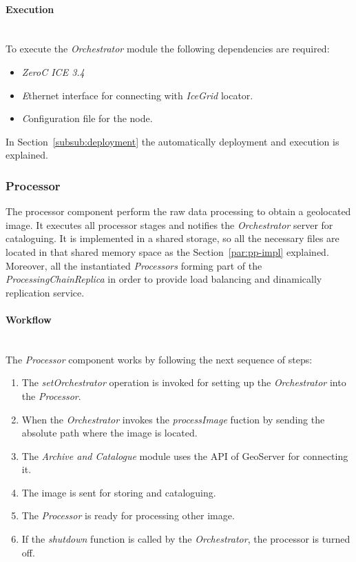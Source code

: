 \paragraph{Execution}~\\

To execute the \emph{Orchestrator} module the following dependencies
are required:
\begin{itemize}
\item \emph{ZeroC ICE 3.4}
\item \emph Ethernet interface for connecting with \emph{IceGrid} locator.
\item \emph Configuration file for the node.
\end{itemize}
 In Section~\ref{subsub:deployment} the
  automatically deployment and execution is explained. 

\subsubsection{Processor}

The processor component perform the raw data processing to obtain a
geolocated image. It executes all processor stages and notifies the
\emph{Orchestrator} server for cataloguing. It is implemented in a shared
storage, so all the necessary files are located in that shared memory space as
the Section~\ref{par:pp-impl} explained. Moreover, all the instantiated
\emph{Processors} forming part of the \emph{ProcessingChainReplica} in order to
provide load balancing and dinamically replication service.


\paragraph{Workflow}~\\

The \emph{Processor} component works by following the next sequence of steps:

\begin{enumerate}
\item The \emph{setOrchestrator} operation is invoked for setting up the
  \emph{Orchestrator} into the \emph{Processor}.
\item When the \emph{Orchestrator} invokes the \emph{processImage} fuction by sending
  the absolute path where the image is located.
\item The \emph{Archive and Catalogue} module uses the \ac{API} of GeoServer for
  connecting it.
\item The image is sent for storing and cataloguing.
\item The \emph{Processor} is ready for processing other image.
\item If the \emph{shutdown} function is called by the \emph{Orchestrator}, the
  processor is turned off.
\end{enumerate}


